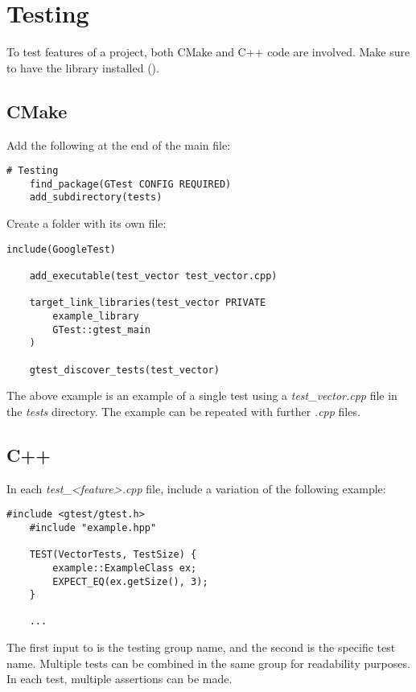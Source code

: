 \section{Testing} \label{s:testing}
To test features of a project, both CMake and C++ code are involved. Make sure to have the  library installed ().

\subsection{CMake}
Add the following at the end of the main  file:
\begin{lstlisting}[style=CmakeStyle]
    # Testing
    find_package(GTest CONFIG REQUIRED)
    add_subdirectory(tests)
\end{lstlisting}

Create a  folder with its own  file:
\begin{lstlisting}[style=CmakeStyle]
    include(GoogleTest)

    add_executable(test_vector test_vector.cpp)

    target_link_libraries(test_vector PRIVATE
        example_library
        GTest::gtest_main
    )

    gtest_discover_tests(test_vector)
\end{lstlisting}
The above example is an example of a single test using a \textit{test\_vector.cpp} file in the \textit{tests} directory. The example can be repeated with further \textit{.cpp} files.



\subsection{C++}
In each \textit{test\_<feature>.cpp} file, include a variation of the following example:
\begin{lstlisting}[style=CppStyle]
    #include <gtest/gtest.h>
    #include "example.hpp"

    TEST(VectorTests, TestSize) {
        example::ExampleClass ex;
        EXPECT_EQ(ex.getSize(), 3);
    }

    ...
\end{lstlisting}
The first input to  is the testing group name, and the second is the specific test name. Multiple tests can be combined in the same group for readability purposes. In each test, multiple assertions can be made.

